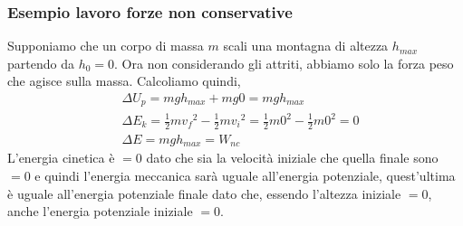         \subsubsection{Esempio lavoro forze non conservative}
            Supponiamo che un corpo di massa $m$ scali una montagna di altezza $h_{max}$ partendo da $h_0=0$. Ora non considerando gli attriti, abbiamo solo la forza peso che agisce sulla massa. Calcoliamo quindi,
            \begin{align*}
                &\Delta U_p=mgh_{max}+mg0=mgh_{max}\\
                &\Delta E_k=\frac{1}{2}m{v_f}^2-\frac{1}{2}m{v_i}^2=\frac{1}{2}m0^2-\frac{1}{2}m{0}^2=0\\
                &\Delta E=mgh_{max}=W_{nc}
            \end{align*}
            L'energia cinetica è $=0$ dato che sia la velocità iniziale che quella finale sono $=0$ e quindi l'energia meccanica sarà uguale all'energia potenziale, quest'ultima è uguale all'energia potenziale finale dato che, essendo l'altezza iniziale $=0$, anche l'energia potenziale iniziale $=0$.
